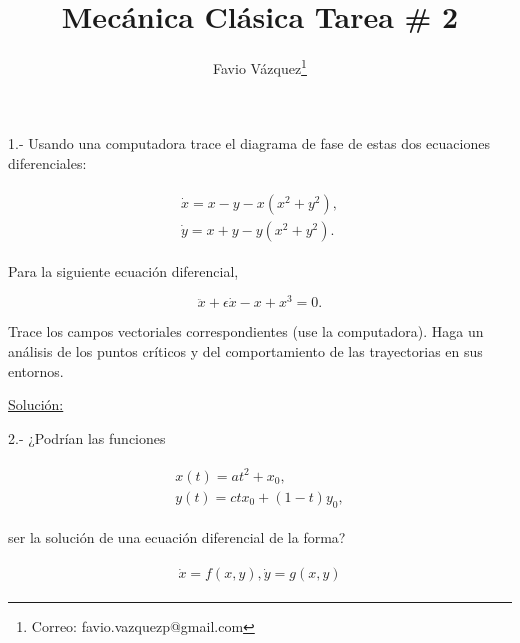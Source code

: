 \documentclass[a4paper,10pt]{article}
\title{Mecánica Clásica Tarea \# 2}
\author{Favio Vázquez\thanks{Correo: favio.vazquezp@gmail.com}}\affil{Instituto de Física. Universidad Nacional Autónoma de México}
\date{}
\begin{document}
\makeatletter
\def\@maketitle{%
  \newpage
  \null
  \vskip 2em%
  \begin{center}%
  \let \footnote \thanks
    {\Large\bfseries \@title \par}%
    \vskip 1.5em%
    {\normalsize
      \lineskip .5em%
      \begin{tabular}[t]{c}%
        \@author
      \end{tabular}\par}%
    \vskip 1em%
    {\normalsize \@date}%
  \end{center}%
  \par
  \vskip 1.5em}
\makeatother

\maketitle

1.- Usando una computadora trace el diagrama de fase de estas dos ecuaciones diferenciales:

\begin{gather*}
 \begin{split}
\dot{x} = x - y - x(x^2+y^2), \\
\dot{y} = x + y - y(x^2+y^2).
 \end{split}
\end{gather*}


Para la siguiente ecuación diferencial, 

$$
\ddot{x} + \epsilon \dot{x} - x + x^3 = 0.
$$

Trace los campos vectoriales correspondientes (use la computadora). Haga un análisis de los 
puntos críticos y del comportamiento de las trayectorias en sus entornos.

\vspace{.3cm}

\underline{Solución:}

\vspace{.3cm}

2.- ¿Podrían las funciones 

\begin{gather*}
 \begin{split}
 x(t) = at^2 + x_0, \\
 y(t) = ctx_0 + (1-t)y_0,
 \end{split}
\end{gather*}

ser la solución de una ecuación diferencial de la forma?

\begin{gather*}
 \begin{split}
 \dot{x} = f(x,y),
 \dot{y} = g(x,y)
 \end{split}
\end{gather*}
\end{document}
